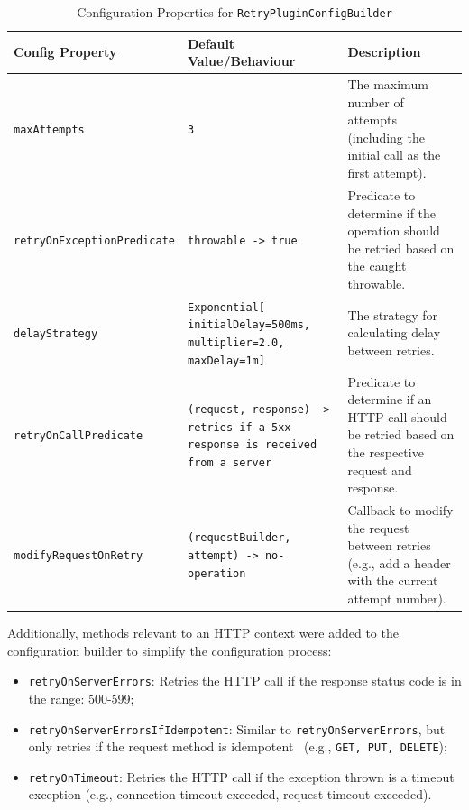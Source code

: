 \begin{table}[!htb]
    \centering
    \caption{Configuration Properties for \texttt{RetryPluginConfigBuilder}}
    \label{tab:retry-ktor-config-builder}
    \vspace{0.3cm}
    \begin{tabular}{|l|p{5cm}|p{6cm}|}
        \hline
        \textbf{Config Property}           & \textbf{Default Value/Behaviour}                                                    & \textbf{Description}                                                                                   \\ \hline
        \texttt{maxAttempts} & \texttt{3} & The maximum number of attempts
        (including the initial call as the first attempt). \\ \hline
        \texttt{retryOnExceptionPredicate} & \texttt{throwable ->
            true} & Predicate
        to determine if the operation should be retried based on the caught throwable. \\ \hline
        \texttt{delayStrategy} & \texttt{Exponential[ initialDelay=500ms, multiplier=2.0, maxDelay=1m]}          & The strategy
        for calculating delay between retries.                                             \\ \hline
        \texttt{retryOnCallPredicate} & \texttt{(request, response) ->
            retries if a 5xx response is received from a server}
        & Predicate to determine if an HTTP call should be retried based on the respective request and response. \\ \hline
        \texttt{modifyRequestOnRetry} & \texttt{(requestBuilder, attempt) ->
            no-operation} & Callback to modify the request between retries
        (e.g., add a header with the current attempt number). \\ \hline
    \end{tabular}
\end{table}

Additionally, methods relevant to an HTTP context were added to the configuration builder to simplify the configuration process:

\begin{itemize}
    \item \texttt{retryOnServerErrors}: Retries the HTTP call if the response status code is in the range: 500-599;
    \item \texttt{retryOnServerErrorsIfIdempotent}: Similar to \texttt{retryOnServerErrors}, but only retries if the request method is idempotent~\cite{idempotent-http-method} (e.g., \texttt{GET, PUT, DELETE});
    \item \texttt{retryOnTimeout}: Retries the HTTP call if the exception thrown is a timeout exception (e.g., connection timeout exceeded, request timeout exceeded).
\end{itemize}
